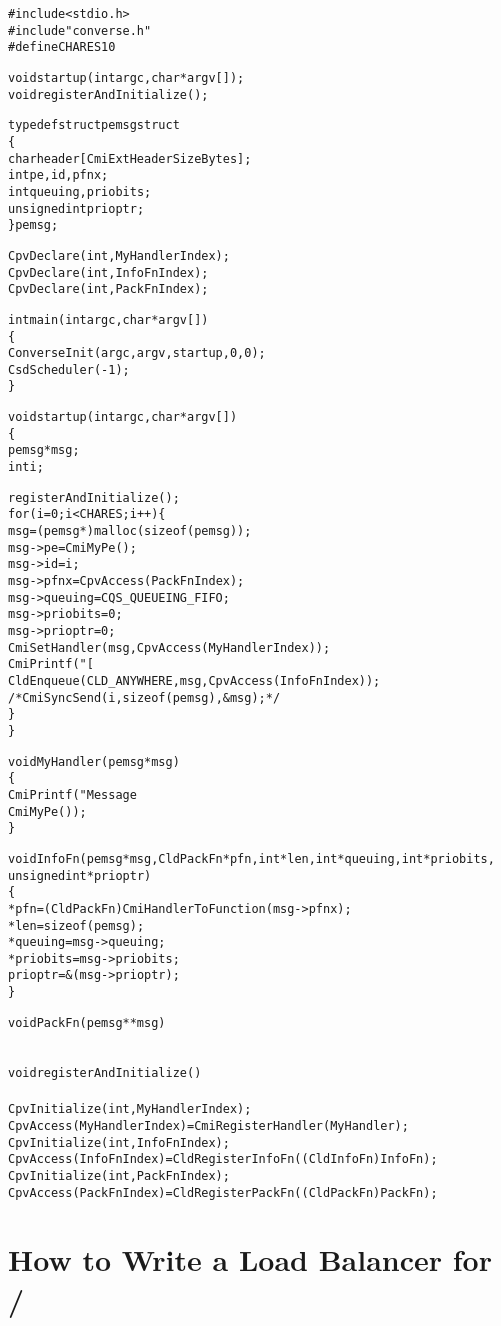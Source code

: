 \begin{alltt}
#include <stdio.h>
#include "converse.h"
#define CHARES 10

void startup(int argc, char *argv[]);
void registerAndInitialize();

typedef struct pemsgstruct
\{
  char header[CmiExtHeaderSizeBytes];
  int pe, id, pfnx;
  int queuing, priobits;
  unsigned int prioptr;
\} pemsg;

CpvDeclare(int, MyHandlerIndex);
CpvDeclare(int, InfoFnIndex);
CpvDeclare(int, PackFnIndex);

int main(int argc, char *argv[]) 
\{
  ConverseInit(argc, argv, startup, 0, 0);
  CsdScheduler(-1);
\}

void startup(int argc, char *argv[])
\{
  pemsg *msg;
  int i;
  
  registerAndInitialize();
  for (i=0; i<CHARES; i++) \{
    msg = (pemsg *)malloc(sizeof(pemsg));
    msg->pe = CmiMyPe();
    msg->id = i;
    msg->pfnx = CpvAccess(PackFnIndex);
    msg->queuing = CQS_QUEUEING_FIFO;
    msg->priobits = 0;
    msg->prioptr = 0;
    CmiSetHandler(msg, CpvAccess(MyHandlerIndex));
    CmiPrintf("[%d] sending message %d\verb+\+n", msg->pe, msg->id);
    CldEnqueue(CLD_ANYWHERE, msg, CpvAccess(InfoFnIndex));
    /*    CmiSyncSend(i, sizeof(pemsg), &msg); */
  \}
\}

void MyHandler(pemsg *msg)
\{
  CmiPrintf("Message %d created on %d handled by %d.\verb+\+n", msg->id, msg->pe, 
	    CmiMyPe());
\}

void InfoFn(pemsg *msg, CldPackFn *pfn, int *len, int *queuing, int *priobits, 
	    unsigned int *prioptr)
\{
  *pfn = (CldPackFn)CmiHandlerToFunction(msg->pfnx);
  *len = sizeof(pemsg);
  *queuing = msg->queuing;
  *priobits = msg->priobits;
  prioptr = &(msg->prioptr);
\}

void PackFn(pemsg **msg)
{
}

void registerAndInitialize()
{
  CpvInitialize(int, MyHandlerIndex);
  CpvAccess(MyHandlerIndex) = CmiRegisterHandler(MyHandler);
  CpvInitialize(int, InfoFnIndex);
  CpvAccess(InfoFnIndex) = CldRegisterInfoFn((CldInfoFn)InfoFn);
  CpvInitialize(int, PackFnIndex);
  CpvAccess(PackFnIndex) = CldRegisterPackFn((CldPackFn)PackFn);
}
\end{alltt}

\section{How to Write a Load Balancer for \converse{}/\charmpp{}}

